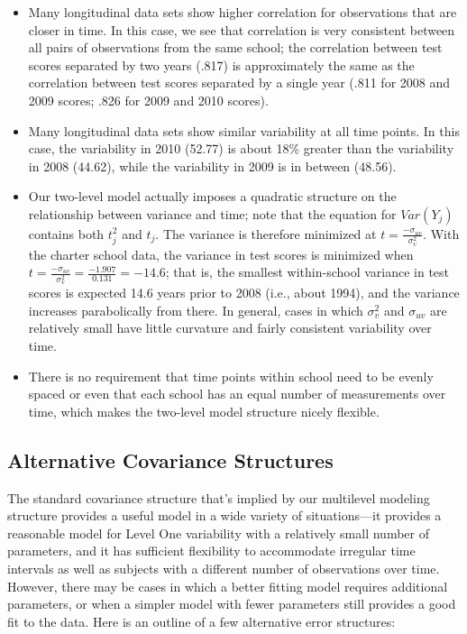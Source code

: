 \documentclass[
]{krantz}
\providecommand{\tightlist}{%
  \setlength{\itemsep}{0pt}\setlength{\parskip}{0pt}}
\begin{document}
\begin{itemize}
\tightlist
\item
  Many longitudinal data sets show higher correlation for observations that are closer in time. In this case, we see that correlation is very consistent between all pairs of observations from the same school; the correlation between test scores separated by two years (.817) is approximately the same as the correlation between test scores separated by a single year (.811 for 2008 and 2009 scores; .826 for 2009 and 2010 scores).
\item
  Many longitudinal data sets show similar variability at all time points. In this case, the variability in 2010 (52.77) is about 18\% greater than the variability in 2008 (44.62), while the variability in 2009 is in between (48.56).
\item
  Our two-level model actually imposes a quadratic structure on the relationship between variance and time; note that the equation for \(Var(Y_{j})\) contains both \(t^{2}_{j}\) and \(t_{j}\). The variance is therefore minimized at \(t=\frac{-\sigma_{uv}}{\sigma^{2}_{v}}\). With the charter school data, the variance in test scores is minimized when \(t=\frac{-\sigma_{uv}}{\sigma^{2}_{v}}=\frac{-1.907}{0.131}=-14.6\); that is, the smallest within-school variance in test scores is expected 14.6 years prior to 2008 (i.e., about 1994), and the variance increases parabolically from there. In general, cases in which \(\sigma^{2}_{v}\) and \(\sigma_{uv}\) are relatively small have little curvature and fairly consistent variability over time.
\item
  There is no requirement that time points within school need to be evenly spaced or even that each school has an equal number of measurements over time, which makes the two-level model structure nicely flexible.
\end{itemize}

\hypertarget{alternateerror}{%
\subsection{Alternative Covariance Structures}\label{alternateerror}}

The standard covariance structure that's implied by our multilevel modeling structure provides a useful model in a wide variety of situations---it provides a reasonable model for Level One variability with a relatively small number of parameters, and it has sufficient flexibility to accommodate irregular time intervals as well as subjects with a different number of observations over time. However, there may be cases in which a better fitting model requires additional parameters, or when a simpler model with fewer parameters still provides a good fit to the data. Here is an outline of a few alternative error structures:
\end{document}
